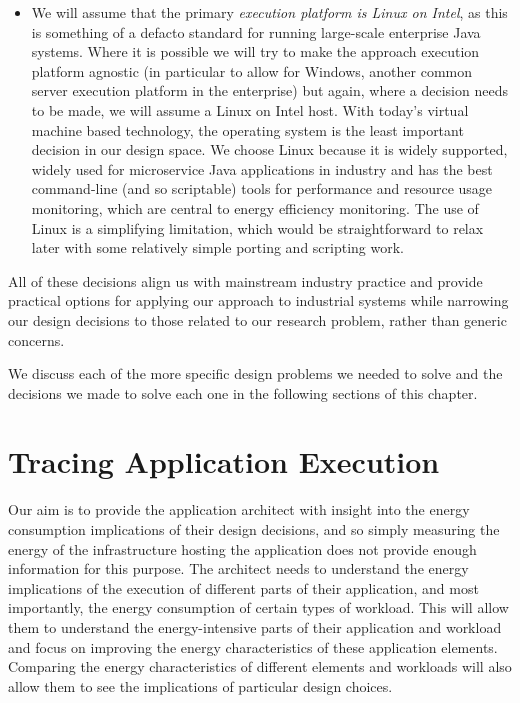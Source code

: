 \begin{itemize}
	\item We will assume that the primary \emph{execution platform is Linux on Intel}, as this is something of a defacto standard for running large-scale enterprise Java systems.  Where it is possible we will try to make the approach execution platform agnostic (in particular to allow for Windows, another common server execution platform in the enterprise) but again, where a decision needs to be made, we will assume a Linux on Intel host.  With today's virtual machine based technology, the operating system is the least important decision in our design space.  We choose Linux because it is widely supported, widely used for microservice Java applications in industry and has the best command-line (and so scriptable) tools for performance and resource usage monitoring, which are central to energy efficiency monitoring.  The use of Linux is a simplifying limitation, which would be straightforward to relax later with some relatively simple porting and scripting work.
\end{itemize}

All of these decisions align us with mainstream industry practice and provide practical options for applying our approach to industrial systems while narrowing our design decisions to those related to our research problem, rather than generic concerns.

We discuss each of the more specific design problems we needed to solve and the decisions we made to solve each one in the following sections of this chapter.

\section{Tracing Application Execution}

Our aim is to provide the application architect with insight into the energy consumption implications of their design decisions, and so simply measuring the energy of the infrastructure hosting the application does not provide enough information for this purpose.  The architect needs to understand the energy implications of the execution of different parts of their application, and most importantly, the energy consumption of certain types of workload.  This will allow them to understand the energy-intensive parts of their application and workload and focus on improving the energy characteristics of these application elements.  Comparing the energy characteristics of different elements and workloads will also allow them to see the implications of particular design choices.

